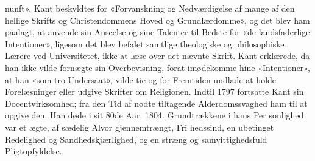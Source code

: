 \documentclass[12pt,a4paper]{book}
\begin{document}
nunft». Kant beskyldtes for «Forvanskning og Nedværdigelse
af mange af den hellige Skrifts og Christendommens Hoved\-%
og Grundlærdomme», og det blev ham paalagt, at anvende
sin Anseelse og sine Talenter til Bedste for «de landsfaderlige
Intentioner», ligesom det blev befalet samtlige theologiske og
philosophiske Lærere ved Universitetet, ikke at læse over det
nævnte Skrift. Kant erklærede, da han ikke vilde fornægte
sin Overbevisning, forat imødekomme hine «Intentioner», at
han «som tro Undersaat», vilde tie og for Fremtiden undlade
at holde Forelæsninger eller udgive Skrifter om Religionen.
Indtil 1797 fortsatte Kant sin Docentvirksomhed; fra den Tid
af nødte tiltagende Alderdomssvaghed ham til at opgive den.
Han døde i sit 80de Aar: 1804. Grundtrækkene i hans Per\-%
sonlighed var et ægte, af sædelig Alvor gjennemtrængt, Fri\-%
hedssind, en ubetinget Redelighed og Sandhedskjærlighed, og
en stræng og samvittighedsfuld Pligtopfyldelse.
\end{document}

